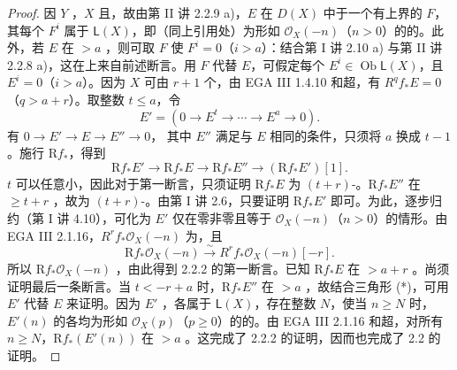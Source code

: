 \begin{proof}
因 $Y$ ，$X$ 且，故由第 II 讲 2.2.9 a)，$E$ 在 $D(X)$ 中于一个有上界的 $F$，其每个 $F^i$ 属于 $\mathsf L(X)$，即（同上引用处）为形如 $\mathcal O_X(-n)$（$n>0$）的的。此外，若 $E$ 在 $>a$ ，则可取 $F$ 使 $F^i=0$（$i>a$）：结合第 I 讲 2.10 a) 与第 II 讲 2.2.8 a)，这在上来自前述断言。用 $F$ 代替 $E$，可假定每个 $E^i\in\operatorname{Ob}\mathsf L(X)$，且 $E^i=0$（$i>a$）。因为 $X$ 可由 $r+1$ 个，由 EGA III 1.4.10 和超，有 $R^qf_*E=0$（$q>a+r$）。取整数 $t\le a$，令
\[E'=(0\longrightarrow E^t\longrightarrow\cdots\longrightarrow E^a\longrightarrow0).\]
有 $0\to E'\to E\to E''\to0$，
其中 $E''$ 满足与 $E$ 相同的条件，只须将 $a$ 换成 $t-1$。施行 $\mathrm Rf_*$，得到
\[\mathrm Rf_*E'\longrightarrow\mathrm Rf_*E\longrightarrow\mathrm Rf_*E''\longrightarrow(\mathrm Rf_*E')[1].\tag{*}\]
$t$ 可以任意小，因此对于第一断言，只须证明 $\mathrm Rf_*E$ 为 $(t+r)$-。$\mathrm Rf_*E''$ 在 $\ge t+r$ ，故为 $(t+r)$-。由第 I 讲 2.6，只要证明 $\mathrm Rf_*E'$ 即可。为此，逐步归约（第 I 讲 4.10），可化为 $E'$ 仅在零非零且等于 $\mathcal O_X(-n)$（$n>0$）的情形。由 EGA III 2.1.16，$R^rf_*\mathcal O_X(-n)$ 为，且
\[\mathrm Rf_*\mathcal O_X(-n)\xrightarrow{\sim}R^rf_*\mathcal O_X(-n)[-r].\]
所以 $\mathrm Rf_*\mathcal O_X(-n)$ ，由此得到 2.2.2 的第一断言。已知 $\mathrm Rf_*E$ 在 $>a+r$ 。尚须证明最后一条断言。当 $t<-r+a$ 时，$\mathrm Rf_*E''$ 在 $>a$ ，故结合三角形 (*)，可用 $E'$ 代替 $E$ 来证明。因为 $E'$ ，各属于 $\mathsf L(X)$，存在整数 $N$，使当 $n\ge N$ 时，$E'(n)$ 的各均为形如 $\mathcal O_X(p)$（$p\ge0$）的的。由 EGA III 2.1.16 和超，对所有 $n\ge N$，$\mathrm Rf_*(E'(n))$ 在 $>a$ 。这完成了 2.2.2 的证明，因而也完成了 2.2 的证明。
\end{proof}
